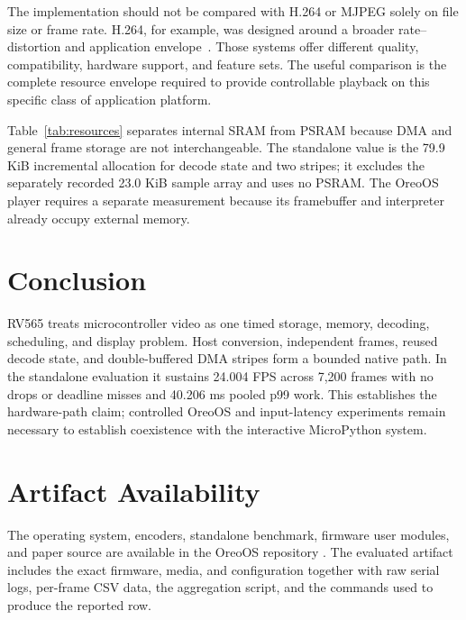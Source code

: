 \documentclass[11pt,twocolumn]{article}
\newcommand{\system}{RV565}
\begin{document}
The implementation should not be compared with H.264 or MJPEG solely on file
size or frame rate.  H.264, for example, was designed around a broader
rate--distortion and application envelope~\cite{wiegand2003overview}.  Those
systems offer different quality, compatibility, hardware support, and feature
sets.  The useful comparison is the complete
resource envelope required to provide controllable playback on this specific
class of application platform.

\begin{table}[t]
\centering
\caption{Measured standalone memory use.}
\label{tab:resources}
\end{table}

Table~\ref{tab:resources} separates internal SRAM from PSRAM because DMA and
general frame storage are not interchangeable.  The standalone value is the
79.9 KiB incremental allocation for decode state and two stripes; it excludes
the separately recorded 23.0 KiB sample array and uses no PSRAM.  The OreoOS
player requires a separate measurement because its framebuffer and interpreter
already occupy external memory.

\section{Conclusion}

\system{} treats microcontroller video as one timed storage, memory, decoding,
scheduling, and display problem.  Host conversion, independent frames, reused
decode state, and double-buffered DMA stripes form a bounded native path.  In
the standalone evaluation it sustains 24.004 FPS across 7,200 frames with no
drops or deadline misses and 40.206 ms pooled p99 work.  This establishes the
hardware-path claim; controlled OreoOS and input-latency experiments remain
necessary to establish coexistence with the interactive MicroPython system.

\section*{Artifact Availability}

The operating system, encoders, standalone benchmark, firmware user modules,
and paper source are available in the OreoOS repository
\cite{bhattacharya2026oreo}.  The evaluated artifact includes the exact
firmware, media, and configuration together with raw serial logs, per-frame
CSV data, the aggregation script, and the commands used to produce the
reported row.

\begingroup
\scriptsize


\endgroup
\end{document}
